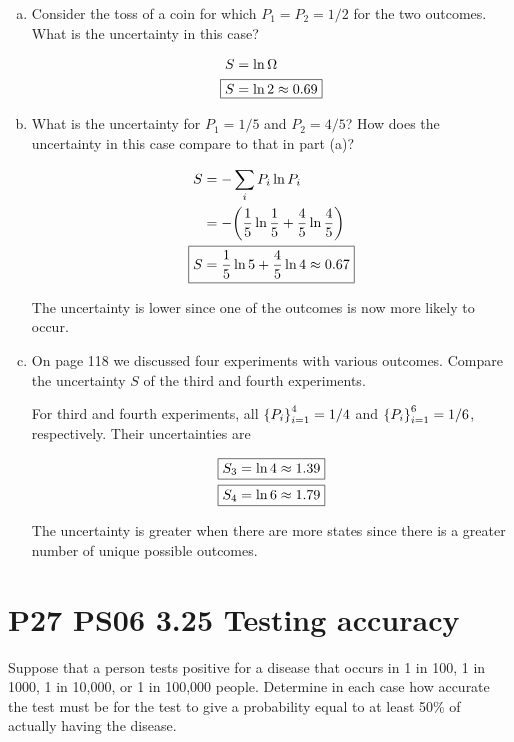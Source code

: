 \documentclass[9pt,a4paper,twocolumn]{article}
\begin{document}
\begin{enumerate}[(a)]

\item Consider the toss of a coin for which $P_1 = P_2 = 1/2$ for the two outcomes. What is the uncertainty in this case?

\begin{align}
	S &= \ln \Omega \label{eq:equalprob} \\
	\Aboxed{
		S &= \ln 2 \approx 0.69
	} \label{eq:answer-a}
\end{align}

\item What is the uncertainty for $P_1 = 1/5$ and $P_2 = 4/5$? How does the uncertainty in this case compare to that in part (a)?

\begin{align}
	S &= -\sum_i P_i \ln P_i \label{eq:unequalprob} \\
	&= -\qty(\frac{1}{5} \ln \frac{1}{5} + \frac{4}{5} \ln \frac{4}{5}) \nonumber \\
	\Aboxed{	
		S &= \frac{1}{5}\ln 5 + \frac{4}{5}\ln 4 \approx 0.67 \label{eq:answer-b}
	}
\end{align}

The uncertainty is lower since one of the outcomes is now more likely to occur.

\item On page 118 we discussed four experiments with various outcomes. Compare the uncertainty $S$ of the third and fourth experiments.

For third and fourth experiments, all $\qty{P_i}_{i=1}^4 = 1/4$ and $\qty{P_i}_{i=1}^6 = 1/6$, respectively. Their uncertainties are

\begin{align}
	\Aboxed{	
		S_3 &= \ln 4 \approx 1.39
	} \label{eq:answer-c1} \\
	\Aboxed{
		S_4 &= \ln 6 \approx 1.79
	} \label{eq:answer-c2}
\end{align}

The uncertainty is greater when there are more states since there is a greater number of unique possible outcomes.

\end{enumerate}

\section{P27 PS06 3.25 Testing accuracy}
Suppose that a person tests positive for a disease that occurs in 1 in 100, 1 in 1000, 1 in 10,000, or 1 in 100,000 people. Determine in each case how accurate the test must be for the test to give a probability equal to at least 50\% of actually having the disease.
\end{document}
